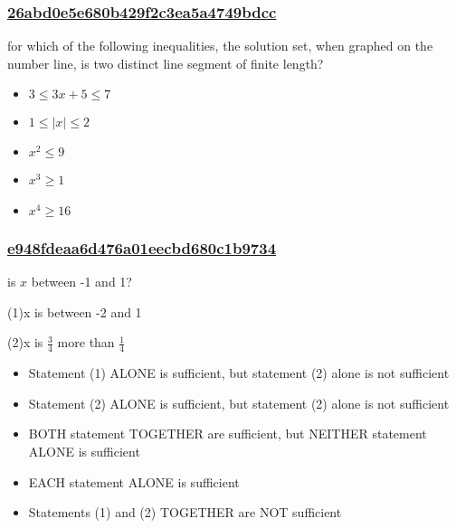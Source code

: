 \documentclass[]{beamer}
\begin{document}
\begin{frame}

    \frametitle{\underline{26abd0e5e680b429f2c3ea5a4749bdcc}}
    for which of the following inequalities, the solution set, when graphed on the number line, is two distinct line segment of finite length?
    \begin{itemize}
        \item
            $ 3\leq3x+5\leq7 $
        \item
            $ 1\leq|x|\leq2 $
        \item
            $ x^2\leq9 $
        \item
            $ x^3\geq1 $\
        \item
            $ x^4\geq16 $
    \end{itemize}
\end{frame}
\begin{frame}
    \frametitle{\underline{e948fdeaa6d476a01eecbd680c1b9734}}
    is $x$ between -1 and 1?\par
(1)x is between -2 and 1\par
(2)x is $\frac{3}{4}$ more than $\frac{1}{4}$
    \begin{itemize}
        \item
            Statement (1) ALONE is sufficient, but statement (2) alone is not sufficient
        \item
            Statement (2) ALONE is sufficient, but statement (2) alone is not sufficient
        \item
            BOTH statement TOGETHER are sufficient, but NEITHER statement ALONE is sufficient
        \item
            EACH statement ALONE is sufficient
        \item
            Statements (1) and (2) TOGETHER are NOT sufficient
    \end{itemize}
\end{frame}
\end{document}
